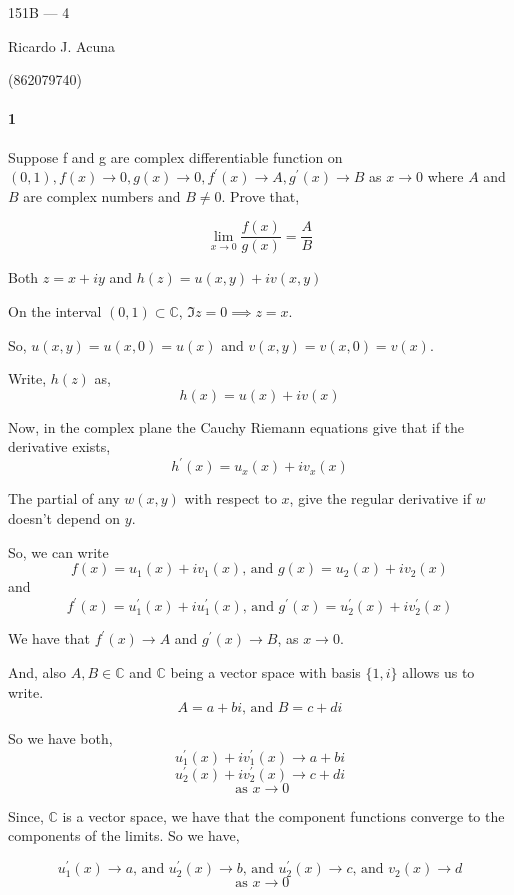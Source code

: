 \documentclass{article}
\newcommand\C{\mathbb{C}}
\begin{document}
\begin{center}
  151B --- 4

  Ricardo J. Acuna

  (862079740)
\end{center}\vspace{1.618em}

\paragraph{1} Suppose f and g are complex differentiable function on
$(0, 1), f(x) → 0, g(x) → 0, f^{\prime}(x)\rightarrow A,
g^{\prime}(x)\rightarrow B$ as $x → 0$ where $A$ and $B$ are complex
numbers and $B \neq 0$. Prove that,

\[\lim_{x\rightarrow 0} \frac{f(x)}{g(x)} = \frac{A}{B}\]



Both $z = x+iy$  and $h(z) = u(x,y) + i v(x,y)$

On the interval $(0,1) \subset \C$, $\Im{z} =0 \implies z = x$.

So, $u(x,y) = u(x,0) = u(x)$ and $v(x,y) = v(x,0) = v(x)$.

Write, $h(z)$ as, $$h(x) = u(x) +i v(x)$$

Now, in the complex plane the Cauchy Riemann equations give that if
the derivative exists,
\[h^{\prime}(x) = u_x(x)+iv_x(x)\]

The partial of any $w(x,y)$ with respect to $x$, give the regular
derivative if $w$ doesn't depend on $y.$

So, we can write $$f(x) = u_1(x)+iv_1(x)\text{, and } g(x)= u_2(x)+iv_2(x)$$ and $$f^{\prime}(x) = u_1^{\prime}(x)+ i
u_1^{\prime}(x)\text{, and } g^{\prime}(x) =
u_2^{\prime}(x)+ i v_2^\prime(x)$$


We have that $f^{\prime}(x)\rightarrow A$ and
$g^{\prime}(x)\rightarrow B$, as $x\rightarrow 0$.

And, also $A,B\in \C$ and $\C$ being a vector space with basis $\{1,i\}$ allows us to
write. $$A = a + b i\text{, and }B = c + d i$$

So we have both,
\[ u_1^{\prime}(x)+ i
v_1^{\prime}(x)\rightarrow a+ b i\]
\[ u_2^{\prime}(x)+ i
v_2^{\prime}(x)\rightarrow c+ d i\]
\[\text{ as } x\rightarrow 0\]

Since, $\C$ is a vector space, we have that the component functions
converge to the components of the limits. So we have,

\[u_1^{\prime}(x)\rightarrow a\text{, and } u_2^{\prime}(x)\rightarrow
  b\text{, and }u_2^{\prime}(x) \rightarrow c \text{, and } v_2(x)
  \rightarrow d\]
\[\text{ as } x\rightarrow 0\]
\end{document}
